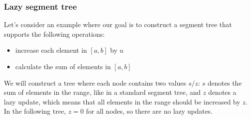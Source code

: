\subsubsection{Lazy segment tree}

Let's consider an example where our goal is to
construct a segment tree that supports the following operations:

\begin{itemize}
\item increase each element in $[a,b]$ by $u$
\item calculate the sum of elements in $[a,b]$
\end{itemize}
We will construct a tree where each node
contains two values $s/z$:
$s$ denotes the sum of elements in the range,
like in a standard segment tree,
and $z$ denotes a lazy update,
which means that all elements in the range
should be increased by $z$.
In the following tree, $z=0$ for all nodes,
so there are no lazy updates.
